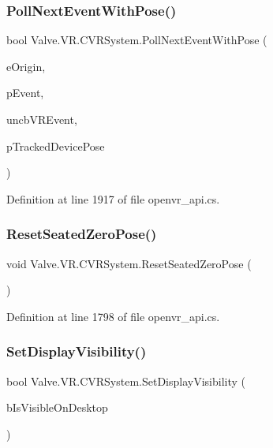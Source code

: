 \subsubsection{\texorpdfstring{PollNextEventWithPose()}{PollNextEventWithPose()}}
{\footnotesize\ttfamily bool Valve.\+V\+R.\+C\+V\+R\+System.\+Poll\+Next\+Event\+With\+Pose (\begin{DoxyParamCaption}\item[{\mbox{\hyperlink{namespace_valve_1_1_v_r_a29be99a3c2f780157bd490db06a7f12f}{E\+Tracking\+Universe\+Origin}}}]{e\+Origin,  }\item[{ref \mbox{\hyperlink{struct_valve_1_1_v_r_1_1_v_r_event__t}{V\+R\+Event\+\_\+t}}}]{p\+Event,  }\item[{uint}]{uncb\+V\+R\+Event,  }\item[{ref \mbox{\hyperlink{struct_valve_1_1_v_r_1_1_tracked_device_pose__t}{Tracked\+Device\+Pose\+\_\+t}}}]{p\+Tracked\+Device\+Pose }\end{DoxyParamCaption})}



Definition at line 1917 of file openvr\+\_\+api.\+cs.

\mbox{\label{class_valve_1_1_v_r_1_1_c_v_r_system_af904b763d37e3fd62655183a9d2756ee}} 
\subsubsection{\texorpdfstring{ResetSeatedZeroPose()}{ResetSeatedZeroPose()}}
{\footnotesize\ttfamily void Valve.\+V\+R.\+C\+V\+R\+System.\+Reset\+Seated\+Zero\+Pose (\begin{DoxyParamCaption}{ }\end{DoxyParamCaption})}



Definition at line 1798 of file openvr\+\_\+api.\+cs.

\mbox{\label{class_valve_1_1_v_r_1_1_c_v_r_system_a4ade672a06d9ebb00320f2cc04314b52}} 
\subsubsection{\texorpdfstring{SetDisplayVisibility()}{SetDisplayVisibility()}}
{\footnotesize\ttfamily bool Valve.\+V\+R.\+C\+V\+R\+System.\+Set\+Display\+Visibility (\begin{DoxyParamCaption}\item[{bool}]{b\+Is\+Visible\+On\+Desktop }\end{DoxyParamCaption})}



